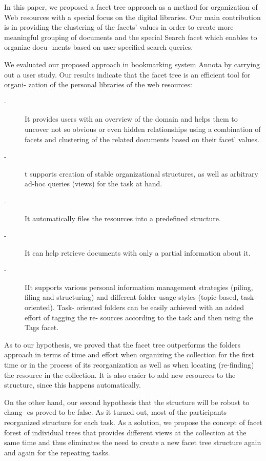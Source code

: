 \documentclass{llncs}
\begin{document}
In this paper, we proposed a facet tree approach as a method for organization of Web resources with a special focus on the digital libraries. Our main contribution is in providing the clustering of the facets’ values in order to create more meaningful grouping of documents and the special Search facet which enables to organize docu- ments based on user-specified search queries.

We evaluated our proposed approach in bookmarking system Annota by carrying out a user study. Our results indicate that the facet tree is an efficient tool for organi- zation of the personal libraries of the web resources:

\begin{description}
	
\item [-] It provides users with an overview of the domain and helps them to uncover not so obvious or even hidden relationships using a combination of facets and clustering of the related documents based on their facet’ values.
\item [-] t supports creation of stable organizational structures, as well as arbitrary ad-hoc queries (views) for the task at hand.
	
\item [-] It automatically files the resources into a predefined structure.
\item [-] It can help retrieve documents with only a partial information about it.
		
\item [-] IIt supports various personal information management strategies (piling, filing and
structuring) and different folder usage styles (topic-based, task-oriented). Task- oriented folders can be easily achieved with an added effort of tagging the re- sources according to the task and then using the Tags facet.

\end{description}

As to our hypothesis, we proved that the facet tree outperforms the folders approach in terms of time and effort when organizing the collection for the first time or in the process of its reorganization as well as when locating (re-finding) the resource in the collection. It is also easier to add new resources to the structure, since this happens automatically.

On the other hand, our second hypothesis that the structure will be robust to chang- es proved to be false. As it turned out, most of the participants reorganized structure for each task. As a solution, we propose the concept of facet forest of individual trees that provides different views at the collection at the same time and thus eliminates the need to create a new facet tree structure again and again for the repeating tasks.
\end{document}

